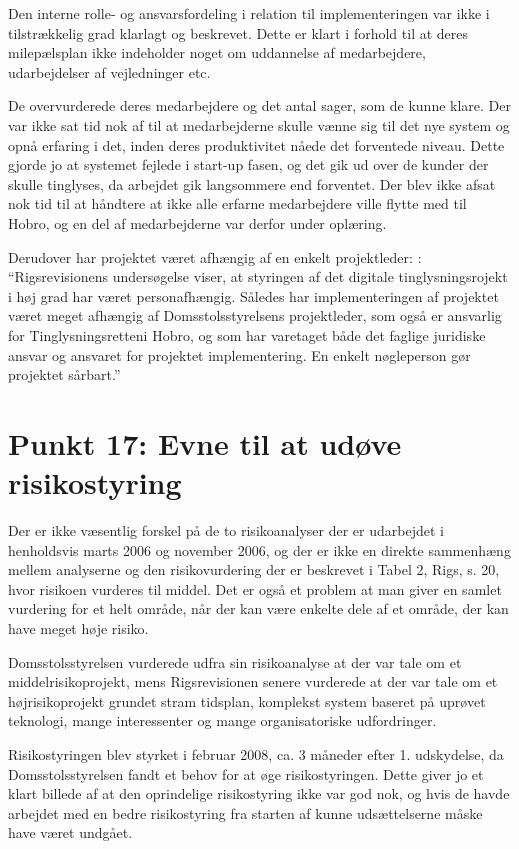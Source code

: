 \documentclass[10pt,a4paper,danish]{article}
\begin{document}
Den interne rolle- og ansvarsfordeling i relation til implementeringen var ikke i tilstrækkelig grad klarlagt og beskrevet. Dette er klart i forhold til at deres milepælsplan ikke indeholder noget om uddannelse af medarbejdere, udarbejdelser af vejledninger etc.

De overvurderede deres medarbejdere og det antal sager, som de kunne klare. Der var ikke sat tid nok af til at medarbejderne skulle vænne sig til det nye system og opnå erfaring i det, inden deres produktivitet nåede det forventede niveau. Dette gjorde jo at systemet fejlede i start-up fasen, og det gik ud over de kunder der skulle tinglyses, da arbejdet gik langsommere end forventet. Der blev ikke afsat nok tid til at håndtere at ikke alle erfarne medarbejdere ville flytte med til Hobro, og en del af medarbejderne var derfor under oplæring. 

Derudover har projektet været afhængig af en enkelt projektleder: \cite[s.~31]{Rigs}: "`Rigsrevisionens undersøgelse viser, at styringen af det digitale tinglysningsrojekt i høj grad har været personafhængig. Således har implementeringen af projektet været meget afhængig af Domsstolsstyrelsens projektleder, som også er ansvarlig for Tinglysningsretteni Hobro, og som har varetaget både det faglige juridiske ansvar og ansvaret for projektet implementering. En enkelt nøgleperson gør projektet sårbart."'


\section{Punkt 17: Evne til at udøve risikostyring}

Der er ikke væsentlig forskel på de to risikoanalyser der er udarbejdet i henholdsvis marts 2006 og november 2006, og der er ikke en direkte sammenhæng mellem analyserne og den risikovurdering der er beskrevet i Tabel 2, Rigs, s. 20, hvor risikoen vurderes til middel. Det er også et problem at man giver en samlet vurdering for et helt område, når der kan være enkelte dele af et område, der kan have meget høje risiko.

Domsstolsstyrelsen vurderede udfra sin risikoanalyse at der var tale om et middelrisikoprojekt, mens Rigsrevisionen senere vurderede at der var tale om et højrisikoprojekt grundet stram tidsplan, komplekst system baseret på uprøvet teknologi, mange interessenter og mange organisatoriske udfordringer.

Risikostyringen blev styrket i februar 2008, ca. 3 måneder efter 1. udskydelse, da Domsstolsstyrelsen fandt et behov for at øge risikostyringen. Dette giver jo et klart billede af at den oprindelige risikostyring ikke var god nok, og hvis de havde arbejdet med en bedre risikostyring fra starten af kunne udsættelserne måske have været undgået.
\end{document}
